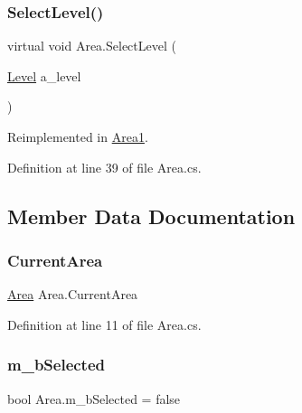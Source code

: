\subsubsection{\texorpdfstring{Select\+Level()}{SelectLevel()}}
{\footnotesize\ttfamily virtual void Area.\+Select\+Level (\begin{DoxyParamCaption}\item[{\mbox{\hyperlink{class_level}{Level}}}]{a\+\_\+level }\end{DoxyParamCaption})\hspace{0.3cm}{\ttfamily [virtual]}}



Reimplemented in \mbox{\hyperlink{class_area1_aa49025530816d90d96ec3665b4f727d2}{Area1}}.



Definition at line 39 of file Area.\+cs.



\subsection{Member Data Documentation}
\mbox{\label{class_area_a1e0e079dfe5003bb20f72e086718d036}} 
\subsubsection{\texorpdfstring{Current\+Area}{CurrentArea}}
{\footnotesize\ttfamily \mbox{\hyperlink{class_area}{Area}} Area.\+Current\+Area\hspace{0.3cm}{\ttfamily [static]}}



Definition at line 11 of file Area.\+cs.

\mbox{\label{class_area_a056631a7e8d58f900cb1f4eeb9f728a9}} 
\subsubsection{\texorpdfstring{m\+\_\+b\+Selected}{m\_bSelected}}
{\footnotesize\ttfamily bool Area.\+m\+\_\+b\+Selected = false\hspace{0.3cm}{\ttfamily [protected]}}



